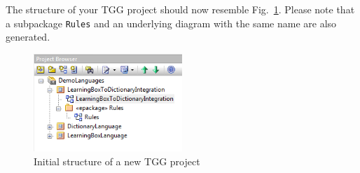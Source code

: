 The structure of your TGG project should now resemble Fig.~\ref{fig:new_tgg_project}.
Please note that a subpackage \texttt{Rules} and an underlying diagram with the same name are also generated.

\begin{figure}[htbp]
\begin{center}
  \includegraphics[width=0.5\textwidth]{pics/tggBilder/tggSchema/tgg3}
  \caption{Initial structure of a new TGG project}  
  \label{fig:new_tgg_project}
\end{center}
\end{figure}

